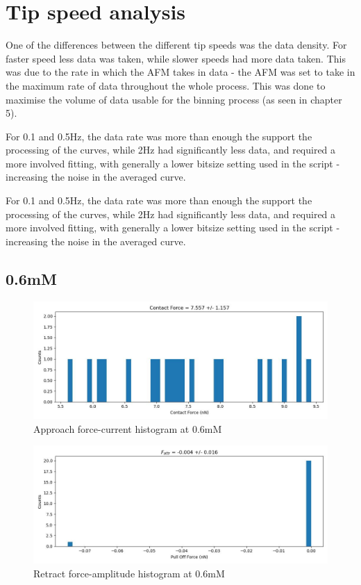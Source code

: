 \section{Tip speed analysis}

One of the differences between the different tip speeds was the data density. For faster speed less data was taken, while slower speeds had more data taken. This was due to the rate in which the AFM takes in data - the AFM was set to take in the maximum rate of data throughout the whole process. This was done to maximise the volume of data usable for the binning process (as seen in chapter 5). 

For 0.1 and 0.5Hz, the data rate was more than enough the support the processing of the curves, while 2Hz had significantly less data, and required a more involved fitting, with generally a lower bitsize setting used in the script - increasing the noise in the averaged curve.

For 0.1 and 0.5Hz, the data rate was more than enough the support the processing of the curves, while 2Hz had significantly less data, and required a more involved fitting, with generally a lower bitsize setting used in the script - increasing the noise in the averaged curve.

\subsection*{0.6mM}
\begin{figure}[h!]
\centering
\includegraphics[width=\textwidth]{chapter7/Tip speed/0.6mM/approach_f_c_hist.jpg}
\caption{Approach force-current histogram at 0.6mM}
\end{figure}

\begin{figure}[h!]
\centering
\includegraphics[width=\textwidth]{chapter7/Tip speed/0.6mM/retract_f_a_hist.jpg}
\caption{Retract force-amplitude histogram at 0.6mM}
\end{figure}


